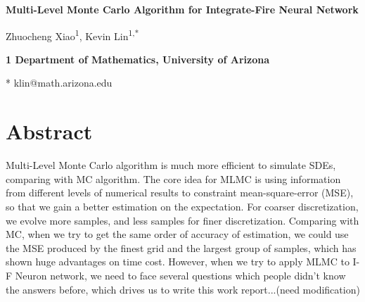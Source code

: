 \documentclass[10pt]{article}
\begin{document}
\begin{flushleft}
{\Large
\bf{Multi-Level Monte Carlo Algorithm for Integrate-Fire Neural Network}
}
\newline
\begin{center}
Zhuocheng Xiao\textsuperscript{1}, 
Kevin Lin\textsuperscript{1,*} 
\end{center} 
\begin{center}
\bf{1} Department of Mathematics, University of Arizona
\end{center}
* klin@math.arizona.edu
\end{flushleft}

\section*{Abstract}
\noindent
Multi-Level Monte Carlo algorithm is much more efficient to simulate SDEs, comparing with MC algorithm. The core idea for MLMC is using information from different levels of numerical results to constraint mean-square-error (MSE), so that we gain a better estimation on the expectation. For coarser discretization, we evolve more samples, and less samples for finer discretization. Comparing with MC, when we try to get the same order of accuracy of estimation, we could use the MSE produced by the finest grid and the largest group of samples, which has shown huge advantages on time cost. However, when we try to apply MLMC to I-F Neuron network, we need to face several questions which people didn't know the answers before, which drives us to write this work report...(need modification)

\bigskip
\end{document}
